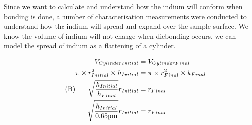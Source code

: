 Since we want to calculate and understand how the indium will conform when bonding is done, a number of characterization measurements were conducted to understand how the indium will spread and expand over the sample surface. We know the volume of indium will not change when diebonding occurs, we can model the spread of indium as a flattening of a cylinder.

\begin{equation}\tag{B}
    \begin{split}
        V_{Cylinder Initial} &= V_{Cylinder Final} \\
        \pi \times r_{Initial}^2 \times h_{Initial} &= \pi \times r_{Final}^2 \times h_{Final} \\
        \sqrt{\frac{h_{Initial}}{h_{Final}}} r_{Initial} &= r_{Final} \\
        \sqrt{\frac{h_{Initial}}{ 0.65 \um}} r_{Initial} &= r_{Final}
    \end{split}
\end{equation}


